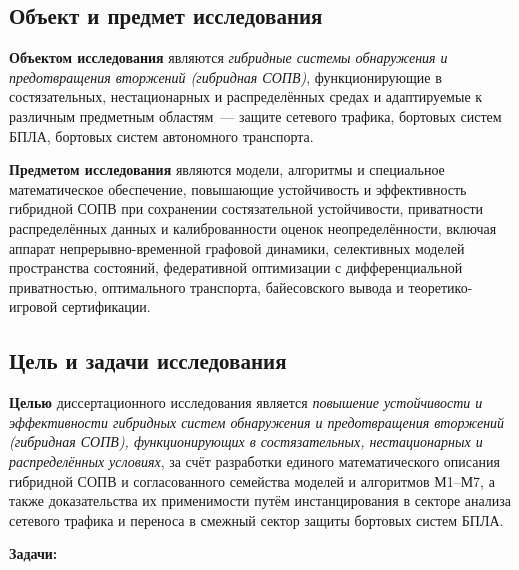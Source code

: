 \documentclass[12pt,a5paper]{article}
\begin{document}
\subsection*{Объект и предмет исследования}

\textbf{Объектом исследования} являются \emph{гибридные
системы обнаружения и предотвращения вторжений (гибридная
СОПВ)}, функционирующие в состязательных, нестационарных и
распределённых средах и адаптируемые к различным предметным
областям~--- защите сетевого трафика, бортовых систем БПЛА,
бортовых систем автономного транспорта.

\textbf{Предметом исследования} являются модели, алгоритмы и
специальное математическое обеспечение, повышающие
устойчивость и эффективность гибридной СОПВ при сохранении
состязательной устойчивости, приватности распределённых
данных и калиброванности оценок неопределённости, включая
аппарат непрерывно-временной графовой динамики, селективных
моделей пространства состояний, федеративной оптимизации с
дифференциальной приватностью, оптимального транспорта,
байесовского вывода и теоретико-игровой сертификации.

\subsection*{Цель и задачи исследования}

\textbf{Целью} диссертационного исследования является
\emph{повышение устойчивости и эффективности гибридных
систем обнаружения и предотвращения вторжений (гибридная
СОПВ), функционирующих в состязательных, нестационарных и
распределённых условиях}, за счёт разработки единого
математического описания гибридной СОПВ и согласованного
семейства моделей и алгоритмов М1--М7, а также доказательства
их применимости путём инстанцирования в секторе анализа
сетевого трафика и переноса в смежный сектор защиты бортовых
систем БПЛА.

\textbf{Задачи:}
\end{document}
